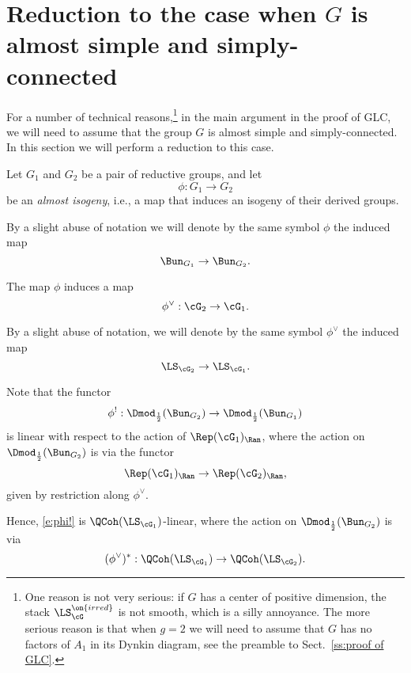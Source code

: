 \documentclass[9pt]{amsart}
\theoremstyle{remark}
\theoremstyle{definition}
\theoremstyle{remark}
\newcommand{\secref}[1]{Sect.~\ref{#1}}
\numberwithin{equation}{section}
\begin{document}
\section{Reduction to the case when \texorpdfstring{$G$}{G} is almost simple and simply-connected} \label{s:sc}

For a number of technical reasons,\footnote{One reason is not very serious: if $G$ has a center of positive dimension, the stack 
$\LS^{\on{irred}}_\cG$ is not smooth, which is a silly annoyance. The more serious reason is that when $g=2$ we will need to assume
that $G$ has no factors of $A_1$ in its Dynkin diagram, see the preamble to \secref{ss:proof of GLC}.} in the main argument in the proof of GLC,
we will need to assume that the group $G$ is almost simple and simply-connected. In this section we will perform a reduction to this case. 


\sssec{}

Let $G_1$ and $G_2$ be a pair of reductive groups, and let 
$$\phi:G_1\to G_2$$
be an \emph{almost isogeny}, i.e., a map that induces an isogeny of their derived groups.

\medskip

By a slight abuse of notation we will denote by the same symbol $\phi$ the induced map
$$\Bun_{G_1}\to \Bun_{G_2}.$$

\sssec{}

The map $\phi$ induces a map
$$\phi^\vee:\cG_2\to \cG_1.$$

By a slight abuse of notation, we will denote by the same symbol $\phi^\vee$ the induced map
$$\LS_{\cG_2}\to \LS_{\cG_1}.$$

\sssec{}

Note that the functor
\begin{equation} \label{e:phi!}
\phi^!:\Dmod_{\frac{1}{2}}(\Bun_{G_2}) \to \Dmod_{\frac{1}{2}}(\Bun_{G_1})
\end{equation} 
is linear with respect to the action of $\Rep(\cG_1)_\Ran$, where the action on 
$\Dmod_{\frac{1}{2}}(\Bun_{G_2})$ is via the functor
$$\Rep(\cG_1)_\Ran\to \Rep(\cG_2)_\Ran,$$
given by restriction along $\phi^\vee$.

\medskip

Hence, \eqref{e:phi!} is $\QCoh(\LS_{\cG_1})$-linear, where the action on 
$\Dmod_{\frac{1}{2}}(\Bun_{G_2})$ is via 
$$(\phi^\vee)^*:\QCoh(\LS_{\cG_1})\to \QCoh(\LS_{\cG_2}).$$

\sssec{}
\end{document}
